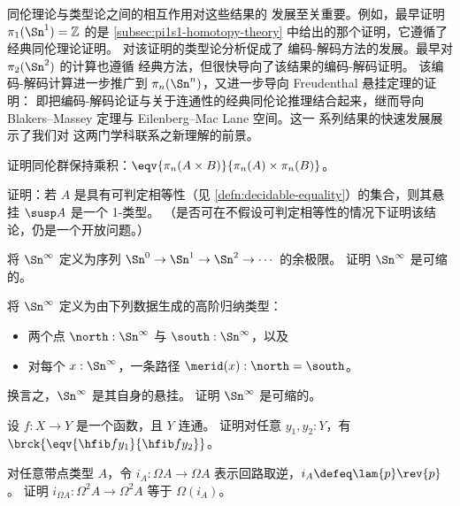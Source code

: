 同伦理论与类型论之间的相互作用对这些结果的
发展至关重要。例如，最早证明
$\pi_1(\Sn ^1)=\mathbb{Z}$ 的是 \cref{subsec:pi1s1-homotopy-theory} 中给出的那个证明，它遵循了经典同伦理论证明。
对该证明的类型论分析促成了
编码-解码方法的发展。最早对 $\pi_2(\Sn ^2)$ 的计算也遵循
经典方法，但很快导向了该结果的编码-解码证明。
该编码-解码计算进一步推广到 $\pi_n(\Sn ^n)$，又进一步导向 Freudenthal 悬挂定理的证明：
即把编码-解码论证与关于连通性的经典同伦论推理结合起来，继而导向 Blakers--Massey
定理与 Eilenberg--Mac Lane 空间。这一
系列结果的快速发展展示了我们对
这两门学科联系之新理解的前景。

\sectionExercises

\begin{ex}\label{ex:homotopy-groups-resp-prod}
  证明同伦群保持乘积：$\eqv{\pi_n(A\times B)}{\pi_n(A)\times \pi_n(B)}$。
\end{ex}

\begin{ex}\label{ex:decidable-equality-susp}
  证明：若 $A$ 是具有可判定相等性（见 \cref{defn:decidable-equality}）的集合，则其悬挂 $\susp A$ 是一个 1-类型。
  （是否可在不假设可判定相等性的情况下证明该结论，仍是一个开放问题。）
\end{ex}

\begin{ex}\label{ex:contr-infinity-sphere-colim}
  将 $\Sn^\infty$ 定义为序列 $\Sn^0 \to \Sn^1 \to \Sn^2 \to\cdots$ 的余极限。
  证明 $\Sn^\infty$ 是可缩的。
\end{ex}

\begin{ex}\label{ex:contr-infinity-sphere-susp}
  将 $\Sn^\infty$ 定义为由下列数据生成的高阶归纳类型：
  \begin{itemize}
  \item 两个点 $\north:\Sn^\infty$ 与 $\south:\Sn^\infty$，以及
  \item 对每个 $x:\Sn^\infty$，一条路径 $\merid(x):\north=\south$。
  \end{itemize}
  换言之，$\Sn^\infty$ 是其自身的悬挂。
  证明 $\Sn^\infty$ 是可缩的。
\end{ex}

\begin{ex}\label{ex:unique-fiber}
  设 $f:X\to Y$ 是一个函数，且 $Y$ 连通。
  证明对任意 $y_1,y_2:Y$，有 $\brck{\eqv{\hfib f {y_1}}{\hfib f {y_2}}}$。
\end{ex}

\begin{ex}\label{ex:ap-path-inversion}
  对任意带点类型 $A$，令 $i_A : \Omega A \to \Omega A$ 表示回路取逆，$i_A \defeq \lam{p} \rev{p}$。
  证明 $i_{\Omega A} : \Omega^2 A \to \Omega^2 A$ 等于 $\Omega(i_A)$。
\end{ex}

